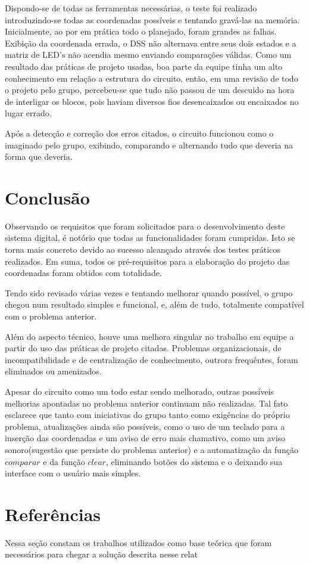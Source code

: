 \documentclass[12pt]{article}
\begin{document}
Dispondo-se de todas as ferramentas necessárias, o teste foi realizado introduzindo-se todas as coordenadas possíveis e tentando gravá-las na memória. Inicialmente, ao por em prática todo o planejado, foram grandes as falhas. Exibição da coordenada errada, o DSS não alternava entre seus dois estados e a matriz de LED's não acendia mesmo enviando comparações válidas. Como um resultado das práticas de projeto usadas, boa parte da equipe tinha um alto conhecimento em relação a estrutura do circuito, então, em uma revisão de todo o projeto pelo grupo, percebeu-se que tudo não passou de um descuido na hora de interligar os blocos, pois haviam diversos fios desencaixados ou encaixados no lugar errado.

Após a detecção e correção dos erros citados, o circuito funcionou como o imaginado pelo grupo, exibindo, comparando e alternando tudo que deveria na forma que deveria.


\section{Conclusão}

Observando os requisitos que foram solicitados para o desenvolvimento deste sistema digital, é notório que todas as funcionalidades foram cumpridas. Isto se torna mais concreto devido ao sucesso alcançado através dos testes práticos realizados. Em suma, todos os pré-requisitos para a elaboração do projeto das coordenadas foram obtidos com totalidade.

Tendo sido revisado várias vezes e tentando melhorar quando possível, o grupo chegou num resultado simples e funcional, e, além de tudo, totalmente compatível com o problema anterior.

Além do aspecto técnico, houve uma melhora singular no trabalho em equipe a partir do uso das práticas de projeto citadas. Problemas organizacionais, de incompatibilidade e de centralização de conhecimento, outrora frequêntes, foram eliminados ou amenizados.

Apesar do circuito como um todo estar sendo melhorado, outras possíveis melhorias apontadas no problema anterior continuam não realizadas. Tal fato esclarece que tanto com iniciativas do grupo tanto como exigências do próprio problema, atualizações ainda são possíveis, como o uso de um teclado para a inserção das coordenadas e um aviso de erro mais chamativo, como um aviso sonoro(sugestão que persiste do problema anterior) e a automatização da função $comparar$ e da função $clear$, eliminando botões do sistema e o deixando sua interface com o usuário mais simples.

\section{Referências}

Nessa seção constam os trabalhos utilizados como base teórica que foram necessários para chegar a solução descrita nesse relat




\end{document}
